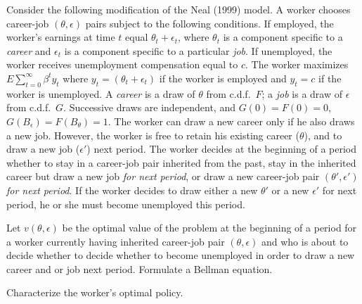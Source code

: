 \medskip
{} 
\medskip
\noindent Consider the following modification of the Neal (1999) model.
 A worker chooses career-job $(\theta,\epsilon)$ pairs
subject to the following conditions.  If employed, the worker's earnings
at time $t$ equal $\theta_t + \epsilon_t$, where $\theta_t$ is a component specific to a {\it career\/}
and ${\epsilon_t}$ is a component specific to a particular {\it job}.  If unemployed, the worker
receives unemployment compensation equal to $c$.  The worker
maximizes $E \sum_{t=0}^\infty  \beta^t  y_t $ where $y_t = (\theta_t + \epsilon_t)$ if the worker is employed
and $y_t = c$ if the worker is unemployed.
A {\it career\/} is a draw
of $\theta$ from  c.d.f.\  $F$; a {\it job\/} is a draw of
$\epsilon$ from c.d.f.\ $G$.   Successive draws are independent,
and $G(0)=F(0)=0$, $G(B_\epsilon)= F(B_\theta)=1$.  The
worker can draw a new career only if he also draws a
new job.
 However, the worker is free to retain his existing
career ($\theta$), and to draw a new job ($\epsilon'$) next period.  The worker
decides at the beginning of a period whether to stay in a
career-job pair inherited from the past, stay in the inherited career but
draw  a new job {\it for next period\/}, or  draw a new career-job pair $(\theta', \epsilon')$ {\it for next period}.  If the worker decides to
draw either a new $\theta'$ or a new $\epsilon'$ for next period, he or she must   become unemployed this period.


\medskip
{} Let $v(\theta,\epsilon)$ be the optimal value of the problem
at the beginning of a period
for a worker currently having inherited  career-job pair $(\theta,\epsilon)$ and
who is about to decide whether to decide whether to become unemployed in order to draw a new career and  or job next period.
Formulate a Bellman equation.

\medskip
{} Characterize the worker's optimal policy.
